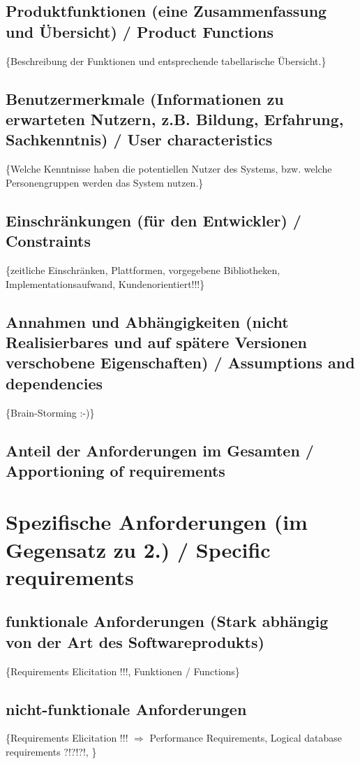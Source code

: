 \documentclass[11pt,a4paper]{article}
\begin{document}
{  	\subsection{Produktfunktionen (eine Zusammenfassung und Übersicht) / Product Functions}  %
	\{Beschreibung der Funktionen und entsprechende tabellarische Übersicht.\}     
    \subsection{Benutzermerkmale (Informationen zu erwarteten Nutzern, z.B. Bildung, Erfahrung, Sachkenntnis) / User characteristics} %
	\{Welche Kenntnisse haben die potentiellen Nutzer des Systems, bzw. welche Personengruppen werden das System nutzen.\}    
	\subsection{Einschränkungen (für den Entwickler) / Constraints} %
	\{zeitliche Einschränken, Plattformen, vorgegebene Bibliotheken, Implementationsaufwand, Kundenorientiert!!!\}
	\subsection{Annahmen und Abhängigkeiten (nicht Realisierbares und auf spätere Versionen verschobene Eigenschaften) / Assumptions and dependencies} %
	\{Brain-Storming :-)\}
	\subsection{Anteil der Anforderungen im Gesamten / Apportioning of requirements} %
	
\section{Spezifische Anforderungen (im Gegensatz zu 2.) / Specific requirements} %
	\subsection{funktionale Anforderungen (Stark abhängig von der Art des Softwareprodukts)} %
	\{Requirements Elicitation !!!, Funktionen / Functions\}
	\subsection{nicht-funktionale Anforderungen} %
	\{Requirements Elicitation !!! $\Longrightarrow$ Performance Requirements, Logical database requirements ?!?!?!, \}
}
\end{document}

